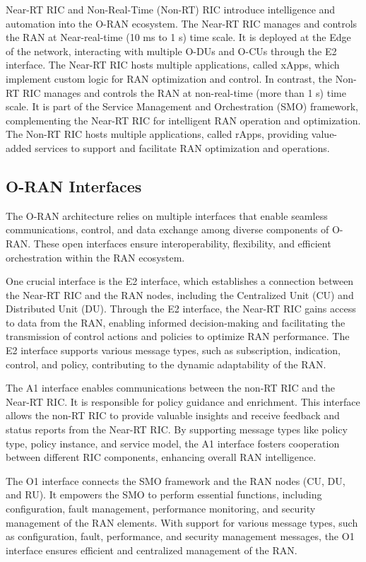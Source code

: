 Near-RT RIC and Non-Real-Time (Non-RT) RIC introduce intelligence and automation into the O-RAN ecosystem. The Near-RT RIC manages and controls the RAN at Near-real-time (10 ms to 1 s) time scale. It is deployed at the Edge of the network, interacting with multiple O-DUs and O-CUs through the E2 interface. The Near-RT RIC hosts multiple applications, called xApps, which implement custom logic for RAN optimization and control. In contrast, the Non-RT RIC manages and controls the RAN at non-real-time (more than 1 s) time scale. It is part of the Service Management and Orchestration (SMO) framework, complementing the Near-RT RIC for intelligent RAN operation and optimization. The Non-RT RIC hosts multiple applications, called rApps, providing value-added services to support and facilitate RAN optimization and operations.

\subsection{O-RAN Interfaces} \label{sec:Interfaces}

The O-RAN architecture relies on multiple interfaces that enable seamless communications, control, and data exchange among diverse components of O-RAN. These open interfaces ensure interoperability, flexibility, and efficient orchestration within the RAN ecosystem.

One crucial interface is the E2 interface, which establishes a connection between the Near-RT RIC and the RAN nodes, including the Centralized Unit (CU) and Distributed Unit (DU). Through the E2 interface, the Near-RT RIC gains access to data from the RAN, enabling informed decision-making and facilitating the transmission of control actions and policies to optimize RAN performance. The E2 interface supports various message types, such as subscription, indication, control, and policy, contributing to the dynamic adaptability of the RAN.

The A1 interface enables communications between the non-RT RIC and the Near-RT RIC. It is responsible for policy guidance and enrichment. This interface allows the non-RT RIC to provide valuable insights and receive feedback and status reports from the Near-RT RIC. By supporting message types like policy type, policy instance, and service model, the A1 interface fosters cooperation between different RIC components, enhancing overall RAN intelligence.

The O1 interface connects the SMO framework and the RAN nodes (CU, DU, and RU). It empowers the SMO to perform essential functions, including configuration, fault management, performance monitoring, and security management of the RAN elements. With support for various message types, such as configuration, fault, performance, and security management messages, the O1 interface ensures efficient and centralized management of the RAN.

